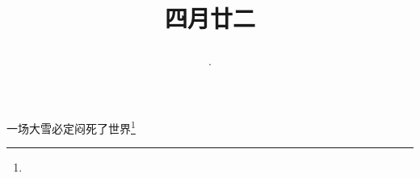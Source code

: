 \title{\date[d=29,m=5,y=2024][year:cn-y,年,month:cn,day:cn,日,·,weekday]·四月廿二 }
一场大雪必定闷死了世界\footnote{ }

